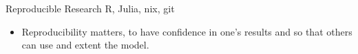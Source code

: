  {Reproducible Research} {} {R, Julia, nix, git} {}
 \begin{itemize}
 \item Reproducibility matters, to have confidence in one's results
 and so that others can use and extent the model.
\end{itemize}

				
